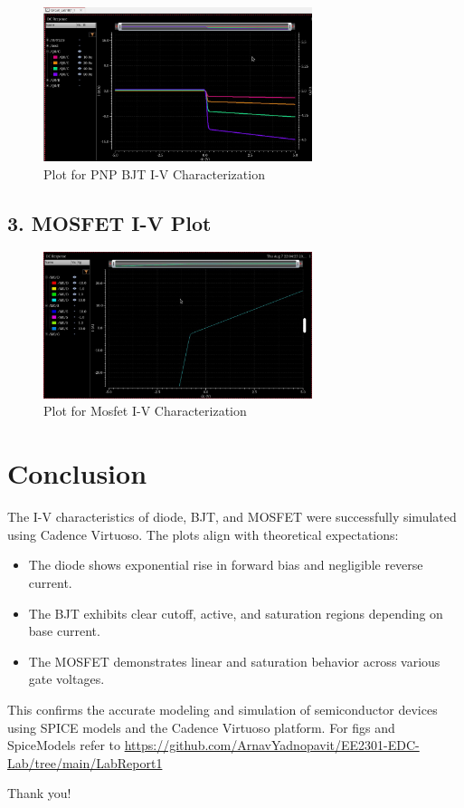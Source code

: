 \documentclass[12pt,a4paper]{article}
\begin{document}
\begin{figure}[H]
    \centering
    \includegraphics[width=0.7\textwidth]{figs/BJT/PNP/Plot.jpg} %
    \caption{Plot for PNP BJT I-V Characterization}
\end{figure}

\subsection*{3. MOSFET I-V Plot}
\begin{figure}[H]
    \centering
    \includegraphics[width=0.7\textwidth]{figs/Mosfet/Plot.jpg} %
    \caption{Plot for Mosfet I-V Characterization}
\end{figure}

\section*{Conclusion}
The I-V characteristics of diode, BJT, and MOSFET were successfully simulated using Cadence Virtuoso. The plots align with theoretical expectations:

\begin{itemize}
    \item The diode shows exponential rise in forward bias and negligible reverse current.
    \item The BJT exhibits clear cutoff, active, and saturation regions depending on base current.
    \item The MOSFET demonstrates linear and saturation behavior across various gate voltages.
\end{itemize}

This confirms the accurate modeling and simulation of semiconductor devices using SPICE models and the Cadence Virtuoso platform.
For figs and SpiceModels refer to
\url{https://github.com/ArnavYadnopavit/EE2301-EDC-Lab/tree/main/LabReport1}


\centering Thank you!
\end{document}
